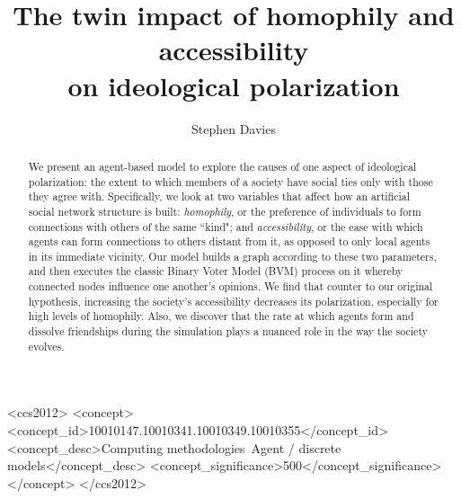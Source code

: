 \documentclass[sigconf]{acmart}
\begin{document}
\title[The twin impact of homophily and accessibility on ideological
polarization]{The twin impact of homophily and accessibility\\on ideological
polarization}


\author{Stephen Davies}

\renewcommand{\shortauthors}{S. Davies}


\begin{abstract}
We present an agent-based model to explore the causes of one aspect of
ideological polarization: the extent to which members of a society have social
ties only with those they agree with. Specifically, we look at two variables
that affect how an artificial social network structure is built:
\textit{homophily}, or the preference of individuals to form connections with
others of the same ``kind"; and \textit{accessibility}, or the ease with which
agents can form connections to others distant from it, as opposed to only
local agents in its immediate vicinity. Our model builds a graph according to
these two parameters, and then executes the classic Binary Voter Model (BVM)
process on it whereby connected nodes influence one another's opinions. We
find that counter to our original hypothesis, increasing the society's
accessibility decreases its polarization, especially for high levels of
homophily. Also, we discover that the rate at which agents form and dissolve
friendships during the simulation plays a nuanced role in the way the society
evolves.
\end{abstract}

%
%
\begin{CCSXML}
<ccs2012>
<concept>
<concept_id>10010147.10010341.10010349.10010355</concept_id>
<concept_desc>Computing methodologies~Agent / discrete models</concept_desc>
<concept_significance>500</concept_significance>
</concept>
</ccs2012>
\end{CCSXML}





\maketitle



\appendix



\end{document}
